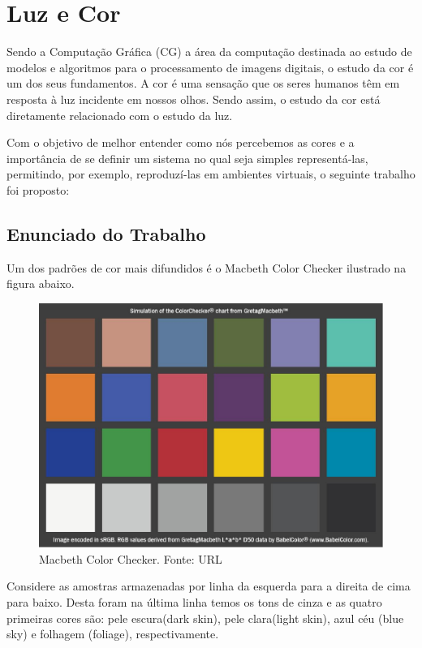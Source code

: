 \chapter{Luz e Cor}
\par
Sendo a Computação Gráfica (CG) a área da computação destinada ao estudo de
modelos e algoritmos para o processamento de imagens digitais, o estudo da cor é
um dos seus fundamentos. A cor é uma sensação que os seres humanos têm em
resposta à luz incidente em nossos olhos. Sendo assim, o estudo da cor está
diretamente relacionado com o estudo da luz.

\par
Com o objetivo de melhor entender como nós percebemos as cores e a importância
de se definir um sistema no qual seja simples representá-las, permitindo, por
exemplo, reproduzí-las em ambientes virtuais, o seguinte trabalho foi proposto:

\section{Enunciado do Trabalho}
\par
Um dos padrões de cor mais difundidos é o Macbeth Color Checker
ilustrado na figura abaixo.

\begin{figure}[!htb]
     \centering
     \includegraphics[scale=0.4]{img/colorChecker.jpg}
     \caption{Macbeth Color Checker. Fonte: URL}
     \label{Label de referência para a imagem}
\end{figure}

\par
Considere as amostras armazenadas por linha da esquerda para a direita de cima
para baixo.  Desta foram na última linha temos os tons de cinza e as quatro
primeiras cores são: pele escura(dark skin), pele clara(light skin), azul céu
(blue sky) e folhagem (foliage), respectivamente.  

